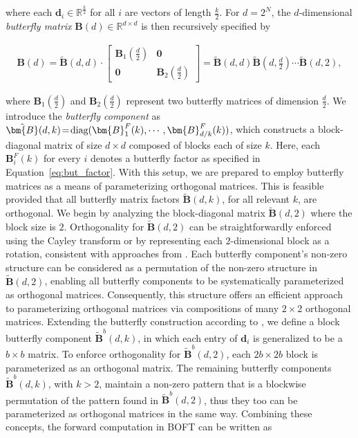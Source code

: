 where each $\bm{d}_i\in\mathbb{R}^{\frac{k}{2}}$ for all $i$ are vectors of length $\frac{k}{2}$. For $d=2^N$, the $d$-dimensional \emph{butterfly matrix} $\bm{B}(d)\in\mathbb{R}^{d\times d}$ is then recursively specified by

\begin{equation}
\begin{aligned}
    \!\!\bm{B}(d)=\tilde{\bm{B}}(d,d)\!\cdot\!\begin{bmatrix}
    \bm{B}_1(\frac{d}{2})\!\!\!\!\! & \bm{0} \\
    \bm{0}\!\!\!\!\! &\bm{B}_2(\frac{d}{2})
    \end{bmatrix}= \tilde{\bm{B}}(d,d)\tilde{\bm{B}}(d,\frac{d}{2})\cdots\tilde{\bm{B}}(d,2),
\end{aligned}
\end{equation}

where $\bm{B}_1(\frac{d}{2})$ and $\bm{B}_2(\frac{d}{2})$ represent two butterfly matrices of dimension $\frac{d}{2}$. We introduce the \emph{butterfly component} as $\thickmuskip=2mu \medmuskip=2mu \tilde{\bm{B}}(d,k)=\text{diag}(\bm{B}^F_1(k),\cdots,\bm{B}^F_{d/k}(k))$, which constructs a block-diagonal matrix of size $d\times d$ composed of blocks each of size $k$. Here, each $\bm{B}^F_i(k)$ for every $i$ denotes a butterfly factor as specified in Equation~\ref{eq:but_factor}. With this setup, we are prepared to employ butterfly matrices as a means of parameterizing orthogonal matrices. This is feasible provided that all butterfly matrix factors $\tilde{\bm{B}}(d,k)$, for all relevant $k$, are orthogonal. We begin by analyzing the block-diagonal matrix $\tilde{\bm{B}}(d,2)$ where the block size is $2$. Orthogonality for $\tilde{\bm{B}}(d,2)$ can be straightforwardly enforced using the Cayley transform or by representing each $2$-dimensional block as a rotation, consistent with approaches from \cite{liu2021orthogonal,qiu2023controlling}. Each butterfly component’s non-zero structure can be considered as a permutation of the non-zero structure in $\tilde{\bm{B}}(d,2)$, enabling all butterfly components to be systematically parameterized as orthogonal matrices. Consequently, this structure offers an efficient approach to parameterizing orthogonal matrices via compositions of many $2\times 2$ orthogonal matrices. Extending the butterfly construction according to \cite{chen2022pixelated}, we define a block butterfly component $\tilde{\bm{B}}^b(d,k)$, in which each entry of $\bm{d}_i$ is generalized to be a $b\times b$ matrix. To enforce orthogonality for $\tilde{\bm{B}}^b(d,2)$, each $2b\times 2b$ block is parameterized as an orthogonal matrix. The remaining butterfly components $\tilde{\bm{B}}^b(d,k)$, with $k>2$, maintain a non-zero pattern that is a blockwise permutation of the pattern found in $\tilde{\bm{B}}^b(d,2)$, thus they too can be parameterized as orthogonal matrices in the same way. Combining these concepts, the forward computation in BOFT can be written as

